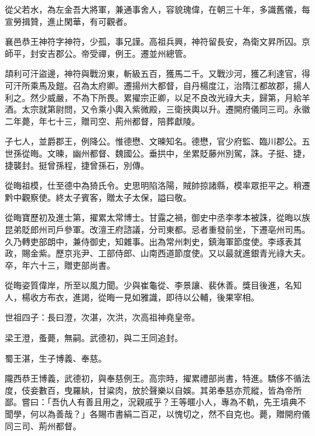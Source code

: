 \begin{pinyinscope}
 從父若水，為左金吾大將軍，兼通事舍人，容貌瑰偉，在朝三十年，多識舊儀，每宣勞揖贊，進止閑華，有可觀者。



 襄邑恭王神符字神符，少孤，事兄謹。高祖兵興，神符留長安，為衛文昇所囚。京師平，封安吉郡公。帝受禪，例王。遷並州總管。



 頡利可汗盜邊，神符與戰汾東，斬級五百，獲馬二千。又戰沙河，獲乙利達官，得可汗所乘馬及鎧。召為太府卿。遷揚州大都督，自丹楊度江，治隋江都故郡，揚人利之。然少威嚴，不為下所畏。累擢宗正卿，以足不良改光祿大夫，歸第，月給羊酒。太宗就第尉問，又令乘小輿入紫微殿，三衛挾輿以升。遷開府儀同三司。永徽二年薨，年七十三，贈司空、荊州都督，陪葬獻陵。



 子七人，並爵郡王，例降公。惟德懋、文暕知名。德懋，官少府監、臨川郡公。五世孫從晦。文暕，幽州都督、魏國公。垂拱中，坐累貶藤州別駕，誅。子挺、捷，捷襲封。挺曾孫程，捷曾孫石，別傳。



 從晦祖模，仕至德中為猗氏令。史思明陷洛陽，賊帥掠諸縣，模率眾拒平之。稍遷黔中觀察使。終太子賓客，贈太子太保，謚曰敬。



 從晦寶歷初及進士第，擢累太常博士。甘露之禍，御史中丞李孝本被誅，從晦以族昆弟貶郎州司戶參軍。改澶王府諮議，分司東都。忌者重發前坐，下遷亳州司馬。久乃轉吏部朗中，兼侍御史，知雜事。出為常州刺史，鎮海軍節度使。李琢表其政，賜金紫。歷京兆尹、工部侍郎、山南西道節度使。又以最就進銀青光祿大夫。卒，年六十三，贈吏部尚書。



 從晦姿質偉岸，所至以風力聞。少與崔龜從、李景讓、裴休善。獎目後進，名知人，楊收方布衣，進謁，從晦一見如雅識，即待以公輔，後果宰相。



 世祖四子：長曰澄，次湛，次洪，次高祖神堯皇帝。



 梁王澄，蚤薨，無嗣。武德初，與二王同追封。



 蜀王湛，生子博義、奉慈。



 隴西恭王博義，武德初，與奉慈例王。高宗時，擢累禮部尚書，特進。驕侈不循法度，伎妾數百，曳羅紈，甘粱肉，放於聲樂以自娛。其弟奉慈亦荒縱，皆為帝所鄙。嘗曰：「吾仇人有善且用之，況親戚乎？王等暱小人，專為不軌，先王墳典不聞學，何以為善哉？」各賜市書絹二百疋，以愧切之，然不自克也。薨，贈開府儀同三司、荊州都督。




\end{pinyinscope}
